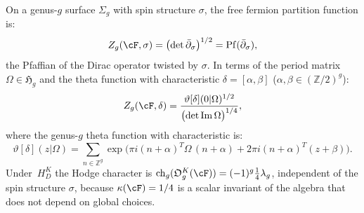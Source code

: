\begin{theorem}
\label{thm:fermion-genus-g}
On a genus-$g$ surface $\Sigma_g$ with spin structure $\sigma$,
the free fermion partition function is:
\begin{equation}\label{eq:fermion-Zg}
Z_g(\cF, \sigma)
= \bigl(\det \bar\partial_\sigma\bigr)^{1/2}
= \mathrm{Pf}(\bar\partial_\sigma),
\end{equation}
the Pfaffian of the Dirac operator twisted by $\sigma$.
In terms of the period matrix
$\Omega \in \mathfrak{H}_g$ and the theta function with
characteristic $\delta = [\alpha, \beta]$
\textup{(}$\alpha, \beta \in (\mathbb{Z}/2)^g$\textup{)}:
\begin{equation}\label{eq:fermion-theta-char}
Z_g(\cF, \delta)
= \frac{\vartheta[\delta](0|\Omega)^{1/2}}
 {\bigl(\det \mathrm{Im}\,\Omega\bigr)^{1/4}},
\end{equation}
where the genus-$g$ theta function with characteristic is:
\begin{equation}\label{eq:genus-g-theta-char}
\vartheta[\delta](z|\Omega)
= \sum_{n \in \mathbb{Z}^g}
 \exp\bigl(\pi i(n+\alpha)^T \Omega\, (n+\alpha)
 + 2\pi i(n+\alpha)^T(z+\beta)\bigr).
\end{equation}
Under~$H_D^K$ the Hodge character is
$\operatorname{ch}_g(\mathfrak O_g^K(\cF))
=(-1)^g\tfrac14\lambda_g$, independent
of the spin structure $\sigma$, because $\kappa(\cF) = 1/4$ is
a scalar invariant of the algebra that does not depend on global
choices.
\end{theorem}

